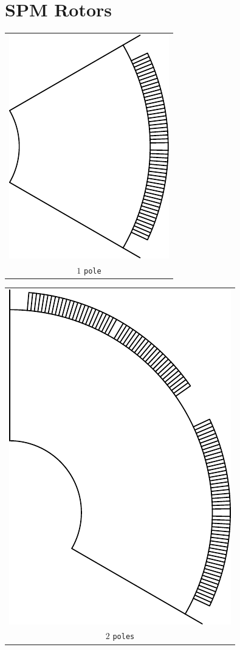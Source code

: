 \documentclass[a4paper,11pt,oneside,fleqn]{report}
\begin{document}
\section{SPM Rotors}
\begin{tabular}{c}
\includegraphics[scale=0.75]{../examples/rotors/1pole} 
\\
$ 1 $ \texttt{pole}
\end{tabular}
\vspace{5mm}

\begin{tabular}{c}
\includegraphics[scale=0.75]{../examples/rotors/2pole} 
\\
$ 2 $ \texttt{poles}
\end{tabular}
\vspace{5mm}
\end{document}
